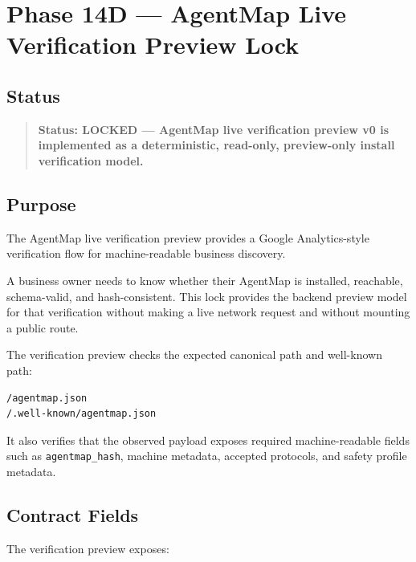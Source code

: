 \documentclass[11pt]{article}
\begin{document}
\section{Phase 14D --- AgentMap Live Verification Preview Lock}
\label{sec:phase14-agentmap-live-verification-lock}

\subsection{Status}

\begin{quote}
\textbf{Status: LOCKED --- AgentMap live verification preview v0 is implemented as a deterministic, read-only, preview-only install verification model.}
\end{quote}

\subsection{Purpose}

The AgentMap live verification preview provides a Google Analytics-style verification flow for machine-readable business discovery.

A business owner needs to know whether their AgentMap is installed, reachable, schema-valid, and hash-consistent. This lock provides the backend preview model for that verification without making a live network request and without mounting a public route.

The verification preview checks the expected canonical path and well-known path:

\begin{verbatim}
/agentmap.json
/.well-known/agentmap.json
\end{verbatim}

It also verifies that the observed payload exposes required machine-readable fields such as \texttt{agentmap\_hash}, machine metadata, accepted protocols, and safety profile metadata.

\subsection{Contract Fields}

The verification preview exposes:
\end{document}
